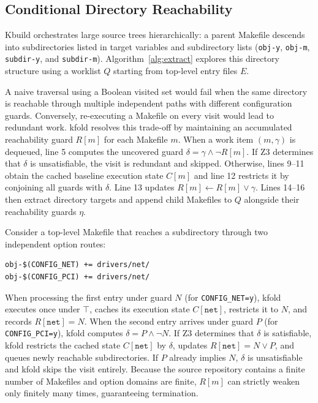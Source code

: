 \documentclass[acmsmall]{acmart}
\newcommand{\tool}{\textsf{kfold}\xspace}
\begin{document}
\subsection{Conditional Directory Reachability}\label{sec:technique:worklist}

Kbuild orchestrates large source trees hierarchically: a parent Makefile descends into subdirectories listed in target variables and subdirectory lists (\texttt{obj-y}, \texttt{obj-m}, \texttt{subdir-y}, and \texttt{subdir-m}).
Algorithm~\ref{alg:extract} explores this directory structure using a worklist $Q$ starting from top-level entry files $E$.

A naive traversal using a Boolean visited set would fail when the same directory is reachable through multiple independent paths with different configuration guards.
Conversely, re-executing a Makefile on every visit would lead to redundant work.
\tool resolves this trade-off by maintaining an accumulated reachability guard $R[m]$ for each Makefile $m$.
When a work item $(m, \gamma)$ is dequeued, line 5 computes the uncovered guard $\delta = \gamma \land \neg R[m]$.
If Z3 determines that $\delta$ is unsatisfiable, the visit is redundant and skipped.
Otherwise, lines 9--11 obtain the cached baseline execution state $C[m]$ and line 12 restricts it by conjoining all guards with $\delta$.
Line 13 updates $R[m] \gets R[m] \lor \gamma$.
Lines 14--16 then extract directory targets and append child Makefiles to $Q$ alongside their reachability guards $\eta$.

Consider a top-level Makefile that reaches a subdirectory through two independent option routes:
\begin{lstlisting}[style=kbuild-example]
obj-$(CONFIG_NET) += drivers/net/
obj-$(CONFIG_PCI) += drivers/net/
\end{lstlisting}
When processing the first entry under guard $N$ (for \texttt{CONFIG\_NET=y}), \tool executes  once under $\top$, caches its execution state $C[\texttt{net}]$, restricts it to $N$, and records $R[\texttt{net}] = N$.
When the second entry arrives under guard $P$ (for \texttt{CONFIG\_PCI=y}), \tool computes $\delta = P \land \neg N$.
If Z3 determines that $\delta$ is satisfiable, \tool restricts the cached state $C[\texttt{net}]$ by $\delta$, updates $R[\texttt{net}] = N \lor P$, and queues newly reachable subdirectories.
If $P$ already implies $N$, $\delta$ is unsatisfiable and \tool skips the visit entirely.
Because the source repository contains a finite number of Makefiles and option domains are finite, $R[m]$ can strictly weaken only finitely many times, guaranteeing termination.
\end{document}
